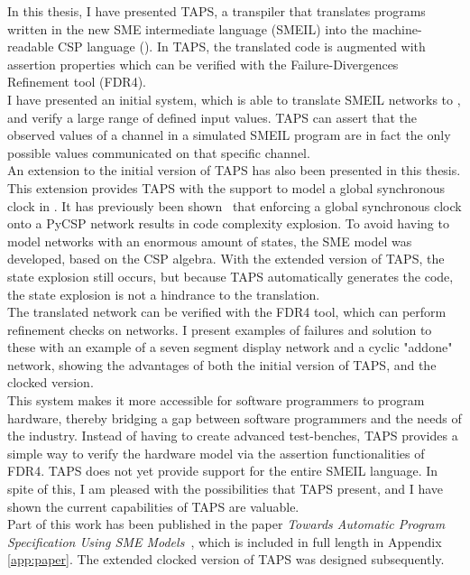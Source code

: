 In this thesis, I have presented TAPS, a transpiler that translates programs written in the
new SME intermediate language (SMEIL) into the machine-readable CSP language (\cspm{}). In TAPS, the translated \cspm{} code is augmented with assertion
properties which can be verified with the Failure-Divergences Refinement tool
(FDR4).\\

I have presented an initial system, which is able to translate SMEIL networks to
\cspm{}, and verify a large range of defined input values. TAPS can assert that
the observed values of a channel in a simulated SMEIL program are in fact the
only possible values communicated on that specific channel. \\

An extension to the initial version of TAPS has also been presented in this
thesis. This extension provides TAPS with the support to model a global
synchronous clock in \cspm{}. It has previously been shown~\cite{Skaarup14}
that enforcing a global synchronous clock onto a PyCSP network results in code complexity explosion. To avoid having to model networks with an enormous amount of
states, the SME model was developed, based on the CSP algebra. With the
extended version of TAPS, the state explosion still occurs, but because TAPS automatically generates the \cspm{} code, the state explosion is not a hindrance to the
translation.\\

The translated \cspm{} network can be verified with the FDR4 tool, which can
perform refinement checks on \cspm{} networks. I present examples of failures
and solution to these with an example of a seven segment display network and a
cyclic "addone" network, showing the advantages of both the initial version of TAPS, and the clocked version.\\

This system makes it more accessible for software programmers to program
hardware, thereby bridging a gap between software programmers and the needs
of the industry.
Instead of having to create advanced test-benches, TAPS provides a simple
way to verify the hardware model via the assertion functionalities of FDR4.
TAPS does not yet provide support for the entire SMEIL language. In spite of this,
I am pleased with the possibilities that TAPS present, and I have shown the current capabilities of TAPS are valuable.\\

Part of this work has been published in the paper \textit{Towards Automatic Program Specification Using SME Models}~\cite{TheglerEtAl2018}, which is included in full length in Appendix \ref{app:paper}. The extended clocked version of TAPS was designed subsequently.
